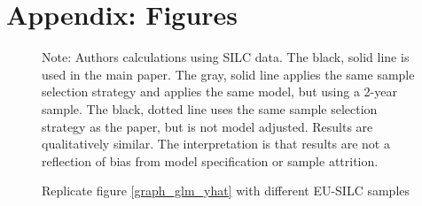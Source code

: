 \clearpage
\section{Appendix: Figures}
\label{appendix_figures}

\begin{figure}
    \caption{Replicate figure \ref{graph_glm_yhat} with different EU-SILC samples}
    \label{graph_eu_silc_compare_2_4_year_panel}
    \footnotesize{Note: Authors calculations using SILC data.  The black, solid line is used in the main paper.  The gray, solid line applies the same sample selection strategy and applies the same model, but using a 2-year sample.  The black, dotted line uses the same sample selection strategy as the paper, but is not model adjusted.  Results are qualitatively similar.  The interpretation is that results are not a reflection of bias from model specification or sample attrition.}
\end{figure}

